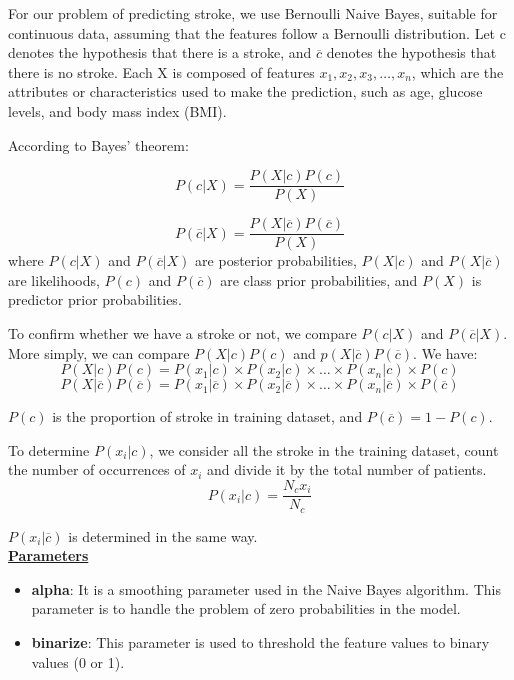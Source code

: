 \documentclass[a4paper]{report}
\begin{document}
	For our problem of predicting stroke, we use Bernoulli Naive Bayes, suitable for continuous data, assuming that the features follow a Bernoulli distribution. Let c denotes the hypothesis that there is a stroke, and \( \overline{c} \) denotes the hypothesis that there is no stroke. Each X is composed of features \(x_1, x_2, x_3, \ldots, x_n\), which are the attributes or characteristics used to make the prediction, such as age, glucose levels, and body mass index (BMI).
	
	According to Bayes' theorem:
	
	\[P(c|X) = \frac{P(X|c)P(c)}{P(X)} \]
	
	\[P(\overline{c}|X) = \frac{P(X|\overline{c})P(\overline{c})}{P(X)} \] 
	where \( P(c|X) \) and \( P(\overline{c}|X) \) are posterior probabilities, \(P(X|c)\) and \(P(X|\overline{c})\) are likelihoods, \(P(c)\) and \(P(\overline{c})\) are class prior probabilities, and \(P(X)\) is predictor prior probabilities.
	
	To confirm whether we have a stroke or not, we compare \(P(c|X)\) and \(P(\overline{c}|X)\). More simply, we can compare \(P(X|c)P(c)\) and \(p(X|\overline{c})P(\overline{c})\). We have:
	\[P(X|c)P(c) = P(x_1|c) \times P(x_2|c) \times \ldots \times P(x_n|c) \times P(c)\]
	\[P(X|\overline{c})P(\overline{c}) = P(x_1|\overline{c}) \times P(x_2|\overline{c}) \times \ldots \times P(x_n|\overline{c}) \times P(\overline{c})\]
	
	\(P(c)\) is the proportion of stroke in training dataset, and \(P(\overline{c}) = 1 - P(c)\). 
	
	To determine \(P(x_i|c)\), we consider all the stroke in the training dataset, count the number of occurrences of \(x_i\) and divide it by the total number of patients.
	\[P(x_i|c) = \frac{N_cx_i}{N_c}\]
	
	\(P(x_i|\overline{c})\) is determined in the same way.\\
	
	\underline{\textbf{\Large Parameters}}
	
	\begin{itemize}
		\item \textbf{alpha}: It is a smoothing parameter used in the Naive Bayes algorithm. This parameter is to handle the problem of zero probabilities in the model.
		\item \textbf{binarize}: This parameter is used to threshold the feature values to binary values (0 or 1).
	\end{itemize}
	
\end{document}
